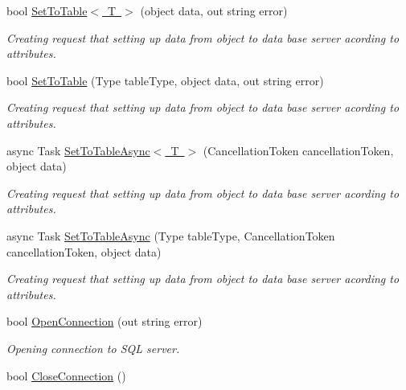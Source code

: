 \begin{DoxyCompactItemize}
bool \mbox{\hyperlink{class_uniform_data_operator_1_1_sql_1_1_my_sql_1_1_my_sql_data_operator_ac1bee965fd57e9b2949c09a6b72a9e3e}{Set\+To\+Table$<$ T $>$}} (object data, out string error)
\begin{DoxyCompactList}\small\item\em Creating request that setting up data from object to data base server acording to attributes. \end{DoxyCompactList}\item 
bool \mbox{\hyperlink{class_uniform_data_operator_1_1_sql_1_1_my_sql_1_1_my_sql_data_operator_a5a12c84883a7e4945b4fb3787a39b302}{Set\+To\+Table}} (Type table\+Type, object data, out string error)
\begin{DoxyCompactList}\small\item\em Creating request that setting up data from object to data base server acording to attributes. \end{DoxyCompactList}\item 
async Task \mbox{\hyperlink{class_uniform_data_operator_1_1_sql_1_1_my_sql_1_1_my_sql_data_operator_ac615a17b6330b292dcf3fd912e1f4fe2}{Set\+To\+Table\+Async$<$ T $>$}} (Cancellation\+Token cancellation\+Token, object data)
\begin{DoxyCompactList}\small\item\em Creating request that setting up data from object to data base server acording to attributes. \end{DoxyCompactList}\item 
async Task \mbox{\hyperlink{class_uniform_data_operator_1_1_sql_1_1_my_sql_1_1_my_sql_data_operator_a036b234868363f2f680e5157ee459439}{Set\+To\+Table\+Async}} (Type table\+Type, Cancellation\+Token cancellation\+Token, object data)
\begin{DoxyCompactList}\small\item\em Creating request that setting up data from object to data base server acording to attributes. \end{DoxyCompactList}\item 
bool \mbox{\hyperlink{class_uniform_data_operator_1_1_sql_1_1_my_sql_1_1_my_sql_data_operator_ae7ad4f4d29d927fa8551b087a6e596b5}{Open\+Connection}} (out string error)
\begin{DoxyCompactList}\small\item\em Opening connection to S\+QL server. \end{DoxyCompactList}\item 
bool \mbox{\hyperlink{class_uniform_data_operator_1_1_sql_1_1_my_sql_1_1_my_sql_data_operator_ae096306ef55611afbe96b0017f2032f6}{Close\+Connection}} ()

\end{DoxyCompactItemize}
